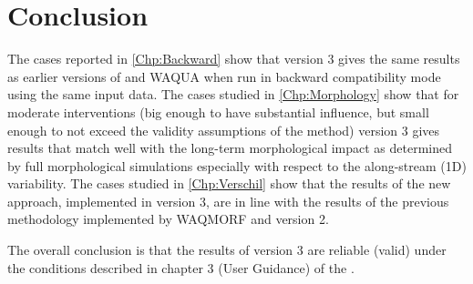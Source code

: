 \chapter{Conclusion}
The cases reported in \autoref{Chp:Backward} show that \dfmi version 3 gives the same results as earlier versions of \dfmi and WAQUA when run in backward compatibility mode using the same input data.
The cases studied in \autoref{Chp:Morphology} show that for moderate interventions (big enough to have substantial influence, but small enough to not exceed the validity assumptions of the method) \dfmi version 3 gives results that match well with the long-term morphological impact as determined by full morphological simulations especially with respect to the along-stream (1D) variability.
The cases studied in \autoref{Chp:Verschil} show that the results of the new approach, implemented in \dfmi version 3, are in line with the results of the previous methodology implemented by WAQMORF and \dfmi version 2.

The overall conclusion is that the results of \dfmi version 3 are reliable (valid) under the conditions described in chapter 3 (User Guidance) of the \citet{um}.